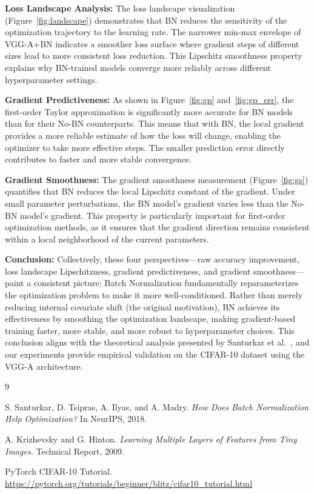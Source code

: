 \documentclass[11pt,a4paper]{article}
\begin{document}
\textbf{Loss Landscape Analysis:} The loss landscape visualization (Figure~\ref{fig:landscape}) demonstrates that BN reduces the sensitivity of the optimization trajectory to the learning rate. The narrower min-max envelope of VGG-A+BN indicates a smoother loss surface where gradient steps of different sizes lead to more consistent loss reduction. This Lipschitz smoothness property explains why BN-trained models converge more reliably across different hyperparameter settings.

\textbf{Gradient Predictiveness:} As shown in Figure~\ref{fig:gp} and~\ref{fig:gp_err}, the first-order Taylor approximation is significantly more accurate for BN models than for their No-BN counterparts. This means that with BN, the local gradient provides a more reliable estimate of how the loss will change, enabling the optimizer to take more effective steps. The smaller prediction error directly contributes to faster and more stable convergence.

\textbf{Gradient Smoothness:} The gradient smoothness measurement (Figure~\ref{fig:gs}) quantifies that BN reduces the local Lipschitz constant of the gradient. Under small parameter perturbations, the BN model's gradient varies less than the No-BN model's gradient. This property is particularly important for first-order optimization methods, as it ensures that the gradient direction remains consistent within a local neighborhood of the current parameters.

\textbf{Conclusion:} Collectively, these four perspectives---raw accuracy improvement, loss landscape Lipschitzness, gradient predictiveness, and gradient smoothness---paint a consistent picture: Batch Normalization fundamentally reparameterizes the optimization problem to make it more well-conditioned. Rather than merely reducing internal covariate shift (the original motivation), BN achieves its effectiveness by smoothing the optimization landscape, making gradient-based training faster, more stable, and more robust to hyperparameter choices. This conclusion aligns with the theoretical analysis presented by Santurkar et al.~\cite{bn_neurips2018}, and our experiments provide empirical validation on the CIFAR-10 dataset using the VGG-A architecture.

\begin{thebibliography}{9}

S. Santurkar, D. Tsipras, A. Ilyas, and A. Madry.
\textit{How Does Batch Normalization Help Optimization?}
In NeurIPS, 2018.

A. Krizhevsky and G. Hinton.
\textit{Learning Multiple Layers of Features from Tiny Images.}
Technical Report, 2009.

PyTorch CIFAR-10 Tutorial.
\url{https://pytorch.org/tutorials/beginner/blitz/cifar10_tutorial.html}

\end{thebibliography}
\end{document}
